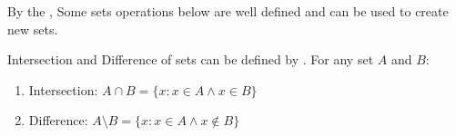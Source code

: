 By the , Some sets operations below are well defined and can be used to create new sets.

\begin{corollary}{}{}
    Intersection and Difference of sets can be defined by . For any set $A$ and $B$:
    \begin{enumerate}
        \item Intersection: $A \cap B = \{x:x \in A \land x \in B\}$
        \item Difference: $A \setminus B = \{x:x \in A \land x \notin B\}$
    \end{enumerate}
\end{corollary}

